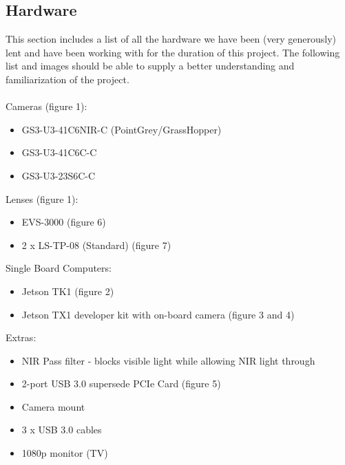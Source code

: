 \subsection{Hardware}
   This section includes a list of all the hardware we have been (very generously) lent and have been working with for the duration of this project. The following list and images should be able to supply a better understanding and familiarization of the project.\\
	\\Cameras (figure 1):  
    		\begin{itemize}
		\item GS3-U3-41C6NIR-C (PointGrey/GrassHopper)
		\item GS3-U3-41C6C-C
		\item GS3-U3-23S6C-C\\
		\end{itemize}
	Lenses (figure 1): 
		\begin{itemize}
		\item EVS-3000 (figure 6)
		\item 2 x LS-TP-08 (Standard) (figure 7)\\
		\end{itemize}					
	Single Board Computers: 
		\begin{itemize}
		\item Jetson TK1 (figure 2) 
		\item Jetson TX1 developer kit with on-board camera (figure 3 and 4)\\
		\end{itemize}		
	Extras: 
		\begin{itemize}
		\item NIR Pass filter - blocks visible light while allowing NIR light through
		\item 2-port USB 3.0 supersede PCIe Card (figure 5)
		\item Camera mount
		\item 3 x USB 3.0 cables
		\item 1080p monitor (TV)\\
		\end{itemize}
		
